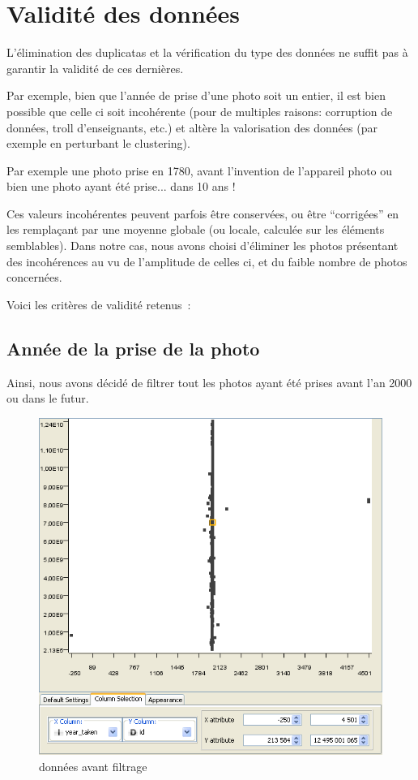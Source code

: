 \section{Validité des données}
    L'élimination des duplicatas et la vérification du type des données ne suffit pas à garantir la validité de ces dernières.

    Par exemple, bien que l'année de prise d'une photo soit un entier, il est bien possible que
    celle ci soit incohérente (pour de multiples raisons: corruption de données, troll d'enseignants, etc.) et
    altère la valorisation des données (par exemple en perturbant le clustering).

    Par exemple une photo prise en 1780, avant l'invention de l'appareil photo ou
    bien une photo ayant été prise... dans 10 ans !

    Ces valeurs incohérentes peuvent parfois être conservées, ou être ``corrigées'' en les remplaçant par une moyenne globale (ou locale,
    calculée sur les éléments semblables). Dans notre cas, nous avons choisi d'éliminer les photos présentant des incohérences au vu de
    l'amplitude de celles ci, et du faible nombre de photos concernées.

    Voici les critères de validité retenus~:

    \subsection{Année de la prise de la photo}
        Ainsi, nous avons décidé de filtrer tout les photos ayant été prises
        avant l'an 2000 ou dans le futur.

        \begin{figure}[h]
            \centering
            \includegraphics[scale=0.35]{../screenshots/year_id_before.png}
            \caption{données avant filtrage}
            \label{diagram:year_id_before}
        \end{figure}

